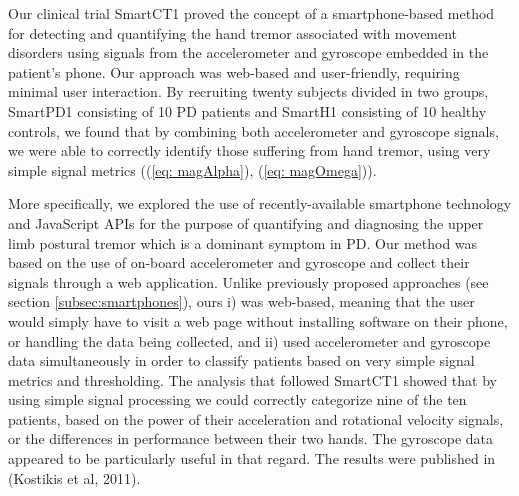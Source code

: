 Our clinical trial \gls{SmartCT1} proved the concept of a smartphone-based method for detecting and quantifying the hand tremor associated with movement disorders using signals from the accelerometer and gyroscope embedded in the patient's phone. Our approach was web-based and user-friendly, requiring minimal user interaction. By recruiting twenty subjects divided in two groups, \gls{SmartPD1} consisting of 10 \gls{PD} patients and \gls{SmartH1} consisting of 10 healthy controls, we found that by combining both accelerometer and gyroscope signals, we were able to correctly identify those suffering from hand tremor, using very simple signal metrics ((\ref{eq: magAlpha}), (\ref{eq: magOmega})). 

More specifically, we explored the use of recently-available smartphone technology and JavaScript \gls{API}s for the purpose of quantifying and diagnosing the upper limb postural tremor which is a dominant symptom in \gls{PD}. Our method was based on the use of on-board accelerometer and gyroscope and collect their signals through a web application. Unlike previously proposed approaches (see section \ref{subsec:smartphones}), ours i) was web-based, meaning that the user would simply have to visit a web page without installing software on their phone, or handling the data being collected, and ii) used accelerometer and gyroscope data simultaneously in order to classify patients based on very simple signal metrics and thresholding. The analysis that followed \gls{SmartCT1} showed that by using simple signal processing we could correctly categorize nine of the ten patients, based on the power of their acceleration and rotational velocity signals, or the differences in performance between their two hands. The gyroscope data appeared to be particularly useful in that regard. The results were published in (Kostikis et al, 2011). 


